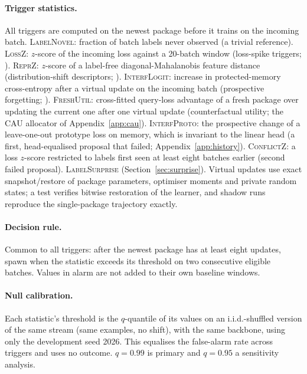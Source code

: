 \documentclass[10pt]{article}
\newcommand{\ls}{\textsc{LabelSurprise}}
\begin{document}
\paragraph{Trigger statistics.} All triggers are computed on the newest package before it trains on the incoming batch. \textsc{LabelNovel}: fraction of batch labels never observed (a trivial reference). \textsc{LossZ}: $z$-score of the incoming loss against a 20-batch window (loss-spike triggers; \citealp{tathe2026lace,wei2025onlinelora}). \textsc{ReprZ}: $z$-score of a label-free diagonal-Mahalanobis feature distance (distribution-shift descriptors; \citealp{wang2025sema}). \textsc{InterfLogit}: increase in protected-memory cross-entropy after a virtual update on the incoming batch (prospective forgetting; \citealp{julian2025cable}). \textsc{FreshUtil}: cross-fitted query-loss advantage of a fresh package over updating the current one after one virtual update (counterfactual utility; the CAU allocator of Appendix~\ref{app:cau}). \textsc{InterfProto}: the prospective change of a leave-one-out prototype loss on memory, which is invariant to the linear head (a first, head-equalised proposal that failed; Appendix~\ref{app:history}). \textsc{ConflictZ}: a loss $z$-score restricted to labels first seen at least eight batches earlier (second failed proposal). \ls{} (Section~\ref{sec:surprise}). Virtual updates use exact snapshot/restore of package parameters, optimiser moments and private random states; a test verifies bitwise restoration of the learner, and shadow runs reproduce the single-package trajectory exactly.

\paragraph{Decision rule.} Common to all triggers: after the newest package has at least eight updates, spawn when the statistic exceeds its threshold on two consecutive eligible batches. Values in alarm are not added to their own baseline windows.

\paragraph{Null calibration.} Each statistic's threshold is the $q$-quantile of its values on an i.i.d.-shuffled version of the same stream (same examples, no shift), with the same backbone, using only the development seed 2026. This equalises the false-alarm rate across triggers and uses no outcome. $q=0.99$ is primary and $q=0.95$ a sensitivity analysis.
\end{document}
